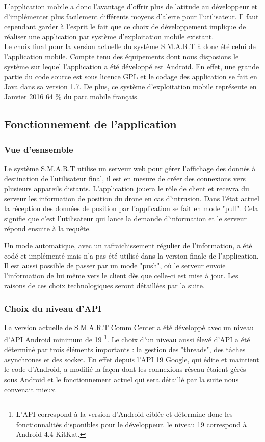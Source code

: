 	 L'application mobile a donc l'avantage d'offrir plus de latitude au développeur et d'implémenter plus facilement différents moyens d'alerte pour l'utilisateur. Il faut cependant garder à l'esprit le fait que ce choix de développement implique de réaliser une application par système d'exploitation mobile existant.
	~\\
	Le choix final pour la version actuelle du système S.M.A.R.T à donc été celui de l'application mobile. Compte tenu des équipements dont nous disposions le système sur lequel l'application a été développé est Android. En effet, une grande partie du code source est sous licence GPL et le codage des application se fait en Java dans sa version 1.7. De plus, ce système d'exploitation mobile représente en Janvier 2016 64 \% du parc mobile français.

\subsection{Fonctionnement de l'application}

\subsubsection{Vue d'esnsemble}

	Le système S.M.A.R.T utilise un serveur web pour gérer l'affichage des donnés à destination de l'utilisateur final, il est en mesure de créer des connexions vers plusieurs appareils distants. L'application jouera le rôle de client et recevra du serveur les information de position du drone en cas d'intrusion. Dans l'état actuel la réception des données de position par l'application se fait en mode "pull". Cela signifie que c'est l'utilisateur qui lance la demande d'information et le serveur répond ensuite à la requête.
	
	Un mode automatique, avec un rafraichissement régulier de l'information, a été codé et implémenté mais n'a pas été utilisé dans la version finale de l'application. Il est aussi possible de passer par un mode "push", où le serveur envoie l'information de lui même vers le client dès que celle-ci est mise à jour. Les raisons de ces choix technologiques seront détaillées par la suite.


\subsubsection{Choix du niveau d'API}

	La version actuelle de S.M.A.R.T Comm Center a été développé avec un niveau d'API Android minimum de 19 \footnote{L'API correspond à la version d'Android ciblée et détermine donc les fonctionnalités disponibles pour le développeur. le niveau 19 correspond à Android 4.4 KitKat.}. Le choix d'un niveau aussi élevé d'API a été déterminé par trois éléments importants : la gestion des "threads", des tâches asynchrones et des socket. En effet depuis l'API 19 Google, qui édite et maintient le code d'Android, a modifié la façon dont les connexions réseau étaient gérés sous Android et le fonctionnement actuel qui sera détaillé par la suite nous convenait mieux. 
	
